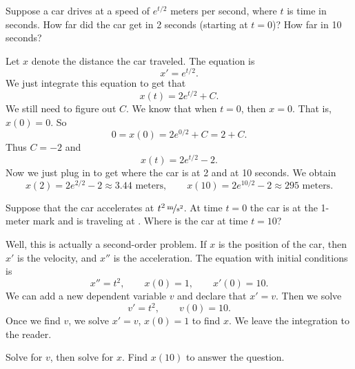 \begin{example}
Suppose a car drives at a speed of $e^{t/2}$ meters per second,
where $t$ is time in seconds.
How far did the car get in 2 seconds (starting at $t=0$)?  How far in 10 seconds?

Let $x$ denote the distance the car traveled.
The equation is
\begin{equation*}
x' = e^{t/2} .
\end{equation*}
We just integrate this equation to get that
\begin{equation*}
x(t) = 2 e^{t/2} + C .
\end{equation*}
We still need to figure out $C$.  We know that when $t=0$, then
$x=0$.  That is, $x(0) = 0$.  So
\begin{equation*}
0 = x(0) = 2e^{0/2} + C = 2 + C .
\end{equation*}
Thus $C = -2$ and
\begin{equation*}
x(t) = 2 e^{t/2} - 2 .
\end{equation*}
Now we just plug in to get where the car is at 2 and at 10 seconds.
We obtain
\begin{equation*}
x(2) = 2e^{2/2} - 2 \approx 3.44 \text{ meters} ,
\qquad
x(10) = 2e^{10/2} - 2 \approx 295 \text{ meters} .
\end{equation*}
\end{example}

\begin{example}
Suppose that the car accelerates at $\unitfrac[t^2]{m}{s^2}$.
At time $t=0$ the car is at the 1-meter mark and is traveling at
.  Where is the car at time $t=10$?

Well, this is actually a second-order problem.  If $x$ is the position of
the car, then $x'$ is the velocity, and $x''$ is the acceleration.
The equation with initial conditions is
\begin{equation*}
x'' = t^2 , \qquad x(0) = 1 , \qquad x'(0) = 10 .
\end{equation*}
We can add a new dependent variable $v$ and declare that $x' = v$.  Then we solve
\begin{equation*}
v' = t^2, \qquad v(0) = 10 .
\end{equation*}
Once we find $v$, we solve $x' = v$, $x(0)=1$ to find $x$.
We leave the integration to the reader.
\end{example}

\begin{exercise}
Solve for $v$, then solve for $x$.  Find $x(10)$ to answer the
question.
\end{exercise}

